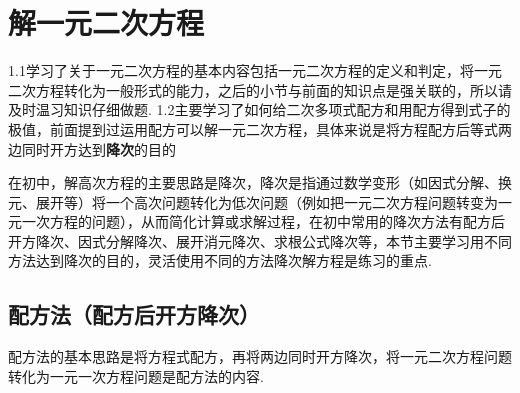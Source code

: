\section{解一元二次方程}
1.1学习了关于一元二次方程的基本内容包括一元二次方程的定义和判定，将一元二次方程转化为一般形式的能力，之后的小节与前面的知识点是强关联的，所以请及时温习知识仔细做题. 1.2主要学习了如何给二次多项式配方和用配方得到式子的极值，前面提到过运用配方可以解一元二次方程，具体来说是将方程配方后等式两边同时开方达到\textbf{降次}的目的
\par
在初中，解高次方程的主要思路是降次，降次是指通过数学变形（如因式分解、换元、展开等）将一个高次问题转化为低次问题（例如把一元二次方程问题转变为一元一次方程的问题），从而简化计算或求解过程，在初中常用的降次方法有配方后开方降次、因式分解降次、展开消元降次、求根公式降次等，本节主要学习用不同方法达到降次的目的，灵活使用不同的方法降次解方程是练习的重点.
\subsection{配方法（配方后开方降次）}


\par


配方法的基本思路是将方程式配方，再将两边同时开方降次，将一元二次方程问题转化为一元一次方程问题是配方法的内容.

